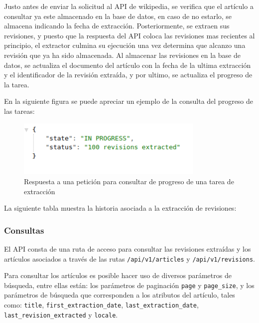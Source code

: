 Justo antes de enviar la solicitud al API de wikipedia, se verifica que el artículo a consultar ya este almacenado en la base de datos, en caso de no estarlo, se almacena indicando la fecha de extracción.
Posteriormente, se extraen sus revisiones, y puesto que la respuesta del API coloca las revisiones mas recientes al principio, el extractor culmina su ejecución una vez determina que alcanzo una revisión que ya ha sido almacenada.
Al almacenar las revisiones en la base de datos, se actualiza el documento del artículo con la fecha de la ultima extracción y el identificador de la revisión extraída, y por ultimo, se actualiza el progreso de la tarea.

En la siguiente figura se puede apreciar un ejemplo de la consulta del progreso de las tareas:

\begin{figure}[H]
	\centering
		\includegraphics[width=0.8\textwidth]{figures/response_status}
	\caption{Respuesta a una petición para consultar de progreso de una tarea de extracción}
	\label{fig:response_status}
\end{figure}

La siguiente tabla muestra la historia asociada a la extracción de revisiones:



\subsubsection{Consultas}

El API consta de una ruta de acceso para consultar las revisiones extraídas y
los artículos asociados a través de las rutas \texttt{/api/v1/articles} y \texttt{/api/v1/revisions}.

Para consultar los artículos es posible hacer uso de diversos parámetros de búsqueda,
entre ellas están: los parámetros de paginación \texttt{page} y \texttt{page\_size},
y los parámetros de búsqueda que corresponden a los atributos del artículo,
tales como: \texttt{title}, \texttt{first\_extraction\_date}, \texttt{last\_extraction\_date}, \texttt{last\_revision\_extracted} y \texttt{locale}.

